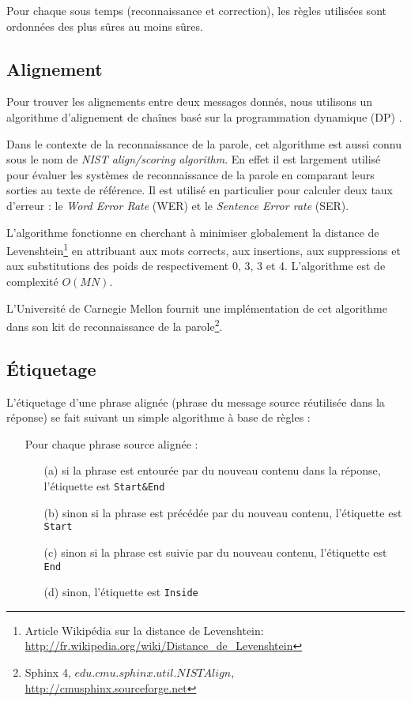 Pour chaque sous temps (reconnaissance et correction), les règles utilisées sont ordonnées des plus sûres au moins sûres.

\subsection{Alignement}

\label{subsec:alignment}

Pour trouver les alignements entre deux messages donnés, nous utilisons un algorithme d'alignement de chaînes basé sur la programmation dynamique (DP) \cite{sankoff:1983}. 

Dans le contexte de la reconnaissance de la parole, cet algorithme est aussi connu sous le nom de \textit{NIST align/scoring algorithm}. En effet il est largement utilisé pour évaluer les systèmes de reconnaissance de la parole en comparant leurs sorties au texte de référence. Il est utilisé en particulier pour calculer deux taux d'erreur : le \textit{Word Error Rate} (WER) et le \textit{Sentence Error rate} (SER).

L'algorithme fonctionne en cherchant à minimiser globalement la distance de Levenshtein\footnote{Article Wikipédia sur la distance de Levenshtein: \url{http://fr.wikipedia.org/wiki/Distance_de_Levenshtein}} \cite{levenshtein1966binary} en attribuant aux mots corrects, aux insertions, aux suppressions et aux substitutions des poids de respectivement 0, 3, 3 et 4. L'algorithme est de complexité $O(MN)$.

L'Université de Carnegie Mellon fournit une implémentation de cet algorithme dans son kit de reconnaissance de la parole\footnote{Sphinx 4, $edu.cmu.sphinx.util.NISTAlign$, \url{http://cmusphinx.sourceforge.net}}.

\subsection{Étiquetage}

\label{subsec:labelling}

L'étiquetage d'une phrase alignée (phrase du message source réutilisée dans la réponse) se fait suivant un simple algorithme à base de règles :

\begin{itemize}
    \item[] Pour chaque phrase source alignée :
    \begin{itemize}
        \item[(a)] si la phrase est entourée par du nouveau contenu dans la réponse, l'étiquette est \texttt{Start\&End}
        \item[(b)] sinon si la phrase est précédée par du nouveau contenu, l'étiquette est \texttt{Start}
        \item[(c)] sinon si la phrase est suivie par du nouveau contenu, l'étiquette est \texttt{End}
        \item[(d)] sinon, l'étiquette est \texttt{Inside}
    \end{itemize}
\end{itemize}
